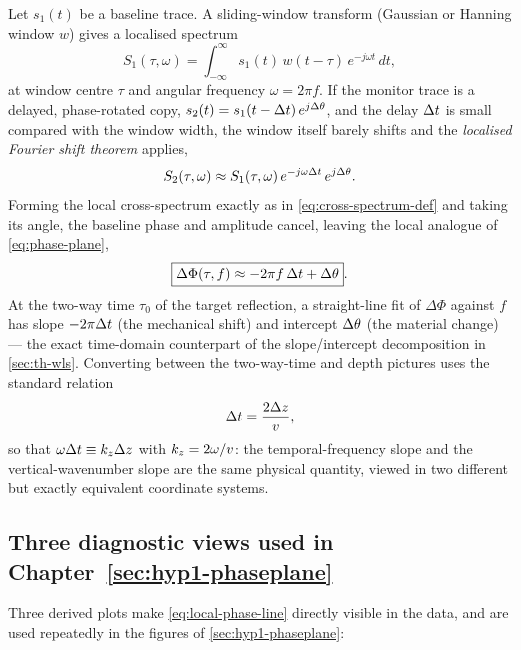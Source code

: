 Let $s_1(t)$ be a baseline trace. A sliding-window transform (Gaussian or
Hanning window $w$) gives a localised spectrum
\begin{equation}
  S_1(\tau,\omega) = \int_{-\infty}^{\infty} s_1(t)\,w(t-\tau)\,e^{-j\omega t}\,dt ,
  \label{eq:stft-def}
\end{equation}
at window centre $\tau$ and angular frequency $\omega=2\pi f$. If the monitor
trace is a delayed, phase-rotated copy, $s_2(t) = s_1(t-\Delta t)\,e^{j\Delta \theta}$,
and the delay $\Delta t$ is small compared with the window width, the window
itself barely shifts and the \emph{localised Fourier shift theorem} applies,
\begin{equation}
  S_2(\tau,\omega) \approx S_1(\tau,\omega)\, e^{-j\omega\Delta t}\, e^{j\Delta \theta} .
  \label{eq:local-shift}
\end{equation}
Forming the local cross-spectrum exactly as in \cref{eq:cross-spectrum-def}
and taking its angle, the baseline phase and amplitude cancel, leaving the
local analogue of \cref{eq:phase-plane},
\begin{equation}
  \boxed{\Delta\Phi(\tau,f) \approx -2\pi f\,\Delta t + \Delta \theta} .
  \label{eq:local-phase-line}
\end{equation}
At the two-way time $\tau_0$ of the target reflection, a straight-line fit of
$\Delta\Phi$ against $f$ has slope $-2\pi\Delta t$ (the mechanical shift) and
intercept $\Delta \theta$ (the material change) — the exact time-domain counterpart
of the slope/intercept decomposition in \cref{sec:th-wls}. Converting between
the two-way-time and depth pictures uses the standard relation
\begin{equation}
  \Delta t = \frac{2\Delta z}{v} ,
  \label{eq:dt-dz}
\end{equation}
so that $\omega\Delta t \equiv k_z\Delta z$ with $k_z = 2\omega/v$: the temporal-frequency
slope and the vertical-wavenumber slope are the same physical quantity, viewed
in two different but exactly equivalent coordinate systems.

\subsection{Three diagnostic views used in Chapter~\ref{sec:hyp1-phaseplane}}

Three derived plots make \cref{eq:local-phase-line} directly visible in the
data, and are used repeatedly in the figures of \cref{sec:hyp1-phaseplane}:

